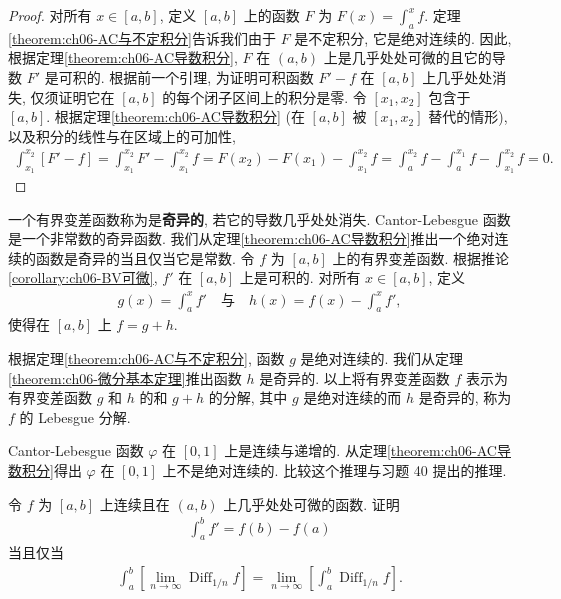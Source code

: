 \documentclass[../../main.tex]{subfiles}
\begin{document}
\begin{proof}
对所有 $x\in[a,b]$, 定义 $[a,b]$ 上的函数 $F$ 为 $F(x)=\int_{a}^{x}f$. 定理\cref{theorem:ch06-AC与不定积分}告诉我们由于 $F$ 是不定积分, 它是绝对连续的. 因此, 根据定理\cref{theorem:ch06-AC导数积分}, $F$ 在 $(a,b)$ 上是几乎处处可微的且它的导数 $F'$ 是可积的. 根据前一个引理, 为证明可积函数 $F'-f$ 在 $[a,b]$ 上几乎处处消失, 仅须证明它在 $[a,b]$ 的每个闭子区间上的积分是零. 令 $[x_{1},x_{2}]$ 包含于 $[a,b]$. 根据定理\cref{theorem:ch06-AC导数积分} (在 $[a,b]$ 被 $[x_{1},x_{2}]$ 替代的情形), 以及积分的线性与在区域上的可加性,
\begin{align*}
\int_{x_{1}}^{x_{2}}[F'-f]=\int_{x_{1}}^{x_{2}}F'-\int_{x_{1}}^{x_{2}}f=F(x_{2})-F(x_{1})-\int_{x_{1}}^{x_{2}}f=\int_{a}^{x_{2}}f-\int_{a}^{x_{1}}f-\int_{x_{1}}^{x_{2}}f=0.
\end{align*}
\end{proof}

一个有界变差函数称为是\textbf{奇异的}, 若它的导数几乎处处消失. Cantor-Lebesgue 函数是一个非常数的奇异函数. 我们从定理\cref{theorem:ch06-AC导数积分}推出一个绝对连续的函数是奇异的当且仅当它是常数. 令 $f$ 为 $[a,b]$ 上的有界变差函数. 根据推论\cref{corollary:ch06-BV可微}, $f'$ 在 $[a,b]$ 上是可积的. 对所有 $x\in[a,b]$, 定义
\begin{align*}
g(x)=\int_{a}^{x}f'\quad\text{与}\quad h(x)=f(x)-\int_{a}^{x}f',
\end{align*}
使得在 $[a,b]$ 上 $f=g+h$.

根据定理\cref{theorem:ch06-AC与不定积分}, 函数 $g$ 是绝对连续的. 我们从定理\cref{theorem:ch06-微分基本定理}推出函数 $h$ 是奇异的. 以上将有界变差函数 $f$ 表示为有界变差函数 $g$ 和 $h$ 的和 $g+h$ 的分解, 其中 $g$ 是绝对连续的而 $h$ 是奇异的, 称为 $f$ 的 Lebesgue 分解.

\begin{exercise}\label{exercise:ch06-48}
Cantor-Lebesgue 函数 $\varphi$ 在 $[0,1]$ 上是连续与递增的. 从定理\cref{theorem:ch06-AC导数积分}得出 $\varphi$ 在 $[0,1]$ 上不是绝对连续的. 比较这个推理与习题 40 提出的推理.
\end{exercise}

\begin{exercise}\label{exercise:ch06-49}
令 $f$ 为 $[a,b]$ 上连续且在 $(a,b)$ 上几乎处处可微的函数. 证明
\begin{align*}
\int_{a}^{b}f'=f(b)-f(a)
\end{align*}
当且仅当
\begin{align*}
\int_{a}^{b}\left[\lim_{n\to\infty}\operatorname{Diff}_{1/n}f\right]=\lim_{n\to\infty}\left[\int_{a}^{b}\operatorname{Diff}_{1/n}f\right].
\end{align*}
\end{exercise}
\end{document}
